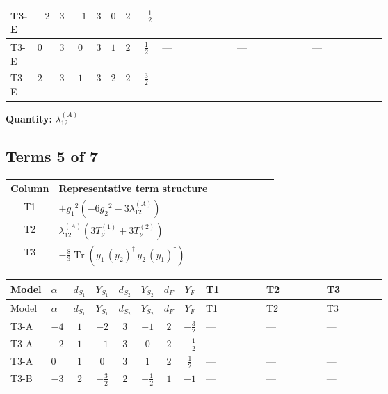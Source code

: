\documentclass[8pt]{article}
\begin{document}
\begin{landscape}
\begin{longtable}{@{}llcccccc >{\raggedright\arraybackslash}p{0.21\linewidth} >{\raggedright\arraybackslash}p{0.21\linewidth} >{\raggedright\arraybackslash}p{0.21\linewidth}@{}}
\midrule
T3-E & $-2$ & $3$ & $-1$ & $3$ & $0$ & $2$ & $-\frac{1}{2}$ & --- & --- & --- \\
\midrule
T3-E & $0$ & $3$ & $0$ & $3$ & $1$ & $2$ & $\frac{1}{2}$ & --- & --- & --- \\
\midrule
T3-E & $2$ & $3$ & $1$ & $3$ & $2$ & $2$ & $\frac{3}{2}$ & --- & --- & --- \\
\midrule
\bottomrule
\end{longtable}
\clearpage
\noindent\textbf{Quantity: }$\lambda_{12}^{(A)}$\par\smallskip
\subsection*{Terms 5 of 7}
\begin{center}
\begin{tabular}{@{}c >{\raggedright\arraybackslash}p{0.82\linewidth}@{}}
\toprule
Column & Representative term structure \\
\midrule
T1 & \(\displaystyle +{g_1}^2 \left(-6 {g_2}^2-3 {\lambda_{12}^{(A)}}\right)\) \\
\midrule
T2 & \(\displaystyle {\lambda_{12}^{(A)}} (3 T_{\nu}^{(1)}+3 T_{\nu}^{(2)})\) \\
\midrule
T3 & \(\displaystyle -\frac{8}{3} \operatorname{Tr}\!\left({y_1}\,\left({y_2}\right)^{\dagger}\,{y_2}\,\left({y_1}\right)^{\dagger}\right)\) \\
\midrule
\bottomrule
\end{tabular}
\end{center}
\smallskip
\tiny
\begin{longtable}{@{}llcccccc >{\raggedright\arraybackslash}p{0.21\linewidth} >{\raggedright\arraybackslash}p{0.21\linewidth} >{\raggedright\arraybackslash}p{0.21\linewidth}@{}}
\toprule
Model & $\alpha$ & $d_{S_1}$ & $Y_{S_1}$ & $d_{S_2}$ & $Y_{S_2}$ & $d_F$ & $Y_F$ & T1 & T2 & T3 \\
\midrule
\endfirsthead
\toprule
Model & $\alpha$ & $d_{S_1}$ & $Y_{S_1}$ & $d_{S_2}$ & $Y_{S_2}$ & $d_F$ & $Y_F$ & T1 & T2 & T3 \\
\midrule
\endhead
T3-A & $-4$ & $1$ & $-2$ & $3$ & $-1$ & $2$ & $-\frac{3}{2}$ & --- & --- & --- \\
\midrule
T3-A & $-2$ & $1$ & $-1$ & $3$ & $0$ & $2$ & $-\frac{1}{2}$ & --- & --- & --- \\
\midrule
T3-A & $0$ & $1$ & $0$ & $3$ & $1$ & $2$ & $\frac{1}{2}$ & --- & --- & --- \\
\midrule
T3-B & $-3$ & $2$ & $-\frac{3}{2}$ & $2$ & $-\frac{1}{2}$ & $1$ & $-1$ & --- & --- & --- \\

\end{longtable}
\end{landscape}
\end{document}
